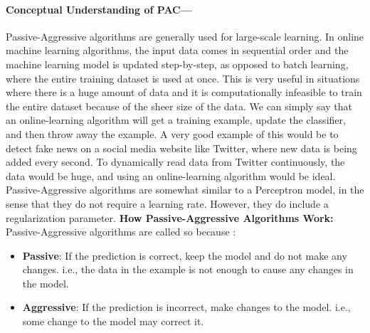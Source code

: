 \documentclass[11.5pt]{article}
\begin{document}
\begin{multicols}{2}
\paragraph{Conceptual Understanding of PAC---}\cite{geeksforgeeks}
Passive-Aggressive algorithms are generally used for large-scale learning. In online machine learning algorithms, the input data comes in sequential order and the machine learning model is updated step-by-step, as opposed to batch learning, where the entire training dataset is used at once. This is very useful in situations where there is a huge amount of data and it is computationally infeasible to train the entire dataset because of the sheer size of the data. We can simply say that an online-learning algorithm will get a training example, update the classifier, and then throw away the example.
\newline
A very good example of this would be to detect fake news on a social media website like Twitter, where new data is being added every second. To dynamically read data from Twitter continuously, the data would be huge, and using an online-learning algorithm would be ideal.
\newline
Passive-Aggressive algorithms are somewhat similar to a Perceptron model, in the sense that they do not require a learning rate. However, they do include a regularization parameter.
\newline
\textbf{How Passive-Aggressive Algorithms Work:}\\
Passive-Aggressive algorithms are called so because :
\begin{itemize}
    \item \textbf{Passive}: If the prediction is correct, keep the model and do not make any changes. i.e., the data in the example is not enough to cause any changes in the model.
    \item \textbf{Aggressive}: If the prediction is incorrect, make changes to the model. i.e., some change to the model may correct it.
\end{itemize}


\end{multicols}
\end{document}
